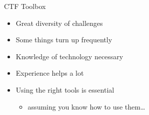 \begin{frame}
  {CTF Toolbox}

  \begin{itemize}
    \item Great diversity of challenges
    \item Some things turn up frequently
    \item Knowledge of technology necessary
    \item Experience helps a lot
  \end{itemize}

  \begin{itemize}
    \item Using the right tools is essential
      \begin{itemize}
        \item assuming you know how to use them\ldots
      \end{itemize}
  \end{itemize}

\end{frame}





